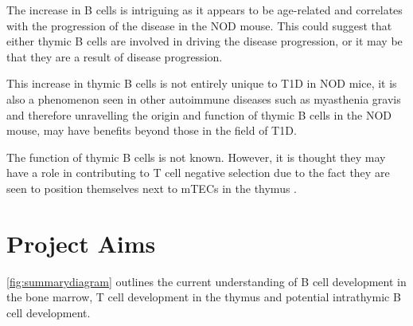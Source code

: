 


The increase in B cells is intriguing as it appears to be age-related and correlates with the progression of the disease in the NOD mouse.
This could suggest that either thymic B cells are involved in driving the disease progression, or it may be that they are a result of disease progression.

This increase in thymic B cells is not entirely unique to T1D in NOD mice, it is also a phenomenon seen in other autoimmune diseases such as myasthenia gravis \citep{Vrolix2014, Christensson1988} and therefore unravelling the origin and function of thymic B cells in the NOD mouse, may have benefits beyond those in the field of T1D.

The function of thymic B cells is not known.
However, it is thought they may have a role in contributing to T cell negative selection due to the fact they are seen to position themselves next to mTECs in the thymus .



\section{Project Aims}

\cref{fig:summarydiagram} outlines the current understanding of B cell development in the bone marrow, T cell development in the thymus and potential intrathymic B cell development.

